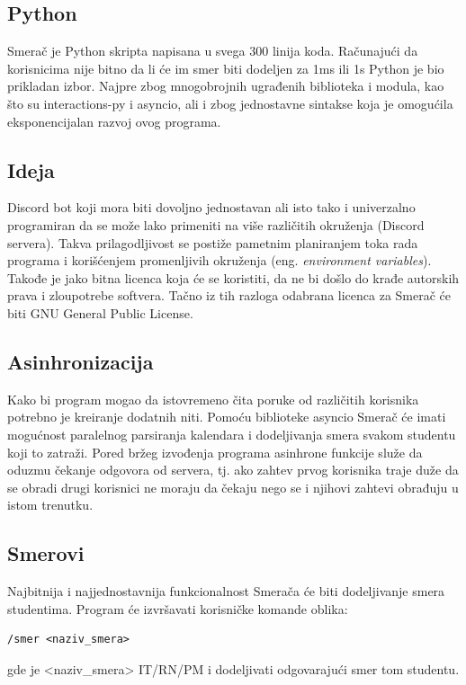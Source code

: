 \documentclass[a4paper,11pt]{article}
\begin{document}
\subsection{Python}
Smerač je Python\cite{python} skripta napisana u svega 300 linija koda. Računajući da korisnicima nije bitno da li će im smer biti dodeljen za 1ms ili 1s Python je bio prikladan izbor. Najpre zbog mnogobrojnih ugrađenih biblioteka i modula, kao što su interactions-py\cite{interactions-py} i asyncio\cite{asyncio}, ali i zbog jednostavne sintakse koja je omogućila eksponencijalan razvoj ovog programa.
\subsection{Ideja}
Discord bot koji mora biti dovoljno jednostavan ali isto tako i univerzalno programiran da se može lako primeniti na više različitih okruženja (Discord servera). Takva prilagodljivost se postiže pametnim planiranjem toka rada programa i korišćenjem promenljivih okruženja (eng. \textit{environment variables}). Takođe je jako bitna licenca koja će se koristiti, da ne bi došlo do krađe autorskih prava i zloupotrebe softvera. Tačno iz tih razloga odabrana licenca za Smerač će biti GNU General Public License\cite{gpl}.
\subsection{Asinhronizacija}
Kako bi program mogao da istovremeno čita poruke od različitih korisnika potrebno je kreiranje dodatnih niti. Pomoću biblioteke asyncio Smerač će imati mogućnost paralelnog parsiranja kalendara i dodeljivanja smera svakom studentu koji to zatraži. Pored bržeg izvođenja programa asinhrone funkcije služe da oduzmu čekanje odgovora od servera, tj. ako zahtev prvog korisnika traje duže da se obradi drugi korisnici ne moraju da čekaju nego se i njihovi zahtevi obrađuju u istom trenutku.
\subsection{Smerovi}
Najbitnija i najjednostavnija funkcionalnost Smerača će biti dodeljivanje smera studentima. Program će izvršavati korisničke komande oblika:
\begin{verbatim}
/smer <naziv_smera>
\end{verbatim}
gde je <naziv\_smera> IT/RN/PM i dodeljivati odgovarajući smer tom studentu.
\newpage
\end{document}
